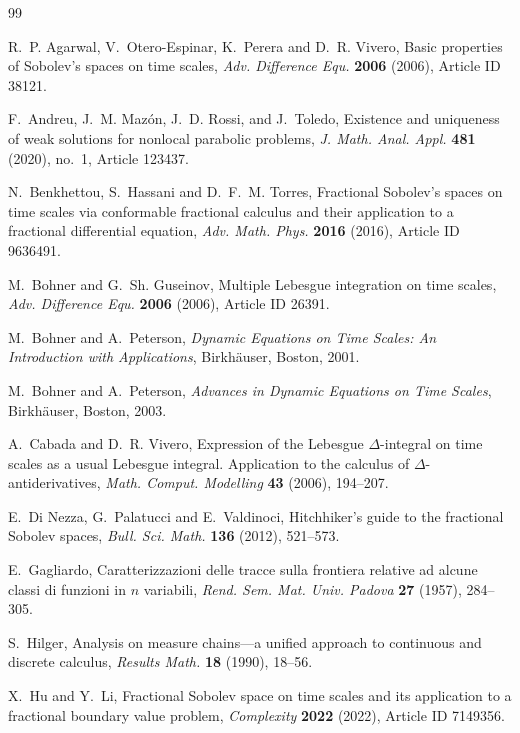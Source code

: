 \documentclass[11pt]{article}
\numberwithin{equation}{section}
\theoremstyle{definition}
\begin{document}
\begin{thebibliography}{99}

R.~P. Agarwal, V.~Otero-Espinar, K.~Perera and D.~R. Vivero,
Basic properties of Sobolev's spaces on time scales,
\emph{Adv. Difference Equ.} \textbf{2006} (2006), Article ID 38121.

F.~Andreu, J.~M. Maz\'on, J.~D. Rossi, and J.~Toledo,
Existence and uniqueness of weak solutions for nonlocal parabolic problems,
\emph{J. Math. Anal. Appl.} \textbf{481} (2020), no.~1, Article 123437.

N.~Benkhettou, S.~Hassani and D.~F.~M. Torres,
Fractional Sobolev's spaces on time scales via conformable fractional calculus and their application to a fractional differential equation,
\emph{Adv. Math. Phys.} \textbf{2016} (2016), Article ID 9636491.

M.~Bohner and G.~Sh. Guseinov,
Multiple Lebesgue integration on time scales,
\emph{Adv. Difference Equ.} \textbf{2006} (2006), Article ID 26391.

M.~Bohner and A.~Peterson,
\emph{Dynamic Equations on Time Scales: An Introduction with Applications},
Birkh\"auser, Boston, 2001.

M.~Bohner and A.~Peterson,
\emph{Advances in Dynamic Equations on Time Scales},
Birkh\"auser, Boston, 2003.

A.~Cabada and D.~R. Vivero,
Expression of the Lebesgue $\Delta$-integral on time scales as a usual Lebesgue integral. Application to the calculus of $\Delta$-antiderivatives,
\emph{Math. Comput. Modelling} \textbf{43} (2006), 194--207.

E.~Di Nezza, G.~Palatucci and E.~Valdinoci,
Hitchhiker's guide to the fractional Sobolev spaces,
\emph{Bull. Sci. Math.} \textbf{136} (2012), 521--573.

E.~Gagliardo,
Caratterizzazioni delle tracce sulla frontiera relative ad alcune classi di funzioni in $n$ variabili,
\emph{Rend. Sem. Mat. Univ. Padova} \textbf{27} (1957), 284--305.

S.~Hilger,
Analysis on measure chains---a unified approach to continuous and discrete calculus,
\emph{Results Math.} \textbf{18} (1990), 18--56.

X.~Hu and Y.~Li,
Fractional Sobolev space on time scales and its application to a fractional boundary value problem,
\emph{Complexity} \textbf{2022} (2022), Article ID 7149356.


\end{thebibliography}
\end{document}
